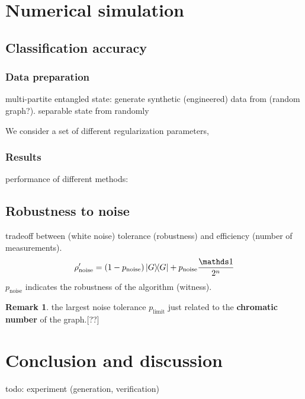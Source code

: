\documentclass[
10pt,
aps,
pra,
linenumbers,
floatfix,
]{revtex4-2}
\theoremstyle{plain}
\theoremstyle{definition}
\newtheorem{remark}{Remark}
\newcommand{\noise}{\text{noise}}
\newcommand{\dm}{\rho}
\begin{document}
\section{Numerical simulation}
\subsection{Classification accuracy}
\subsubsection{Data preparation}
multi-partite entangled state: generate synthetic (engineered) data from (random graph?).
separable state from randomly 

We consider a set of different regularization parameters,

\subsubsection{Results}
performance of different methods: 

\subsection{Robustness to noise}
tradeoff between (white noise) tolerance (robustness) and efficiency (number of measurements).
\begin{equation}
	\dm_{\noise}' = (1-p_{\noise}) \op{G} + p_{\noise} \frac{\identity}{2^n}
\end{equation}
$p_{\noise}$ indicates the robustness of the algorithm (witness).
\begin{remark}
	the largest noise tolerance $p_{\text{limit}}$ just related to the \textbf{chromatic number} of the graph.[??]
\end{remark}
% 
% 

\section{Conclusion and discussion}
todo: experiment (generation, verification) \cite{luEntanglementStructureEntanglement2018}
\end{document}
